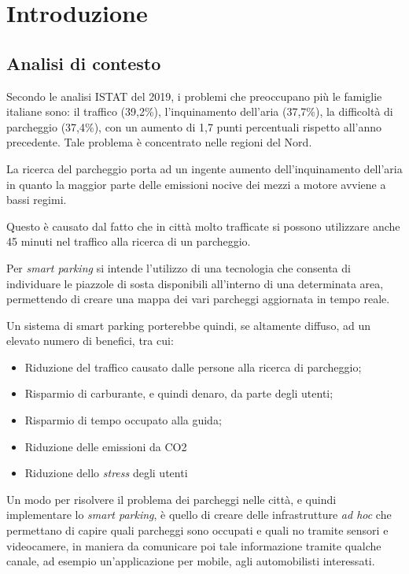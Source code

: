 \hypertarget{introduzione}{%
\chapter{Introduzione}\label{introduzione}}

\hypertarget{analisi-di-contesto}{%
\section{Analisi di contesto}\label{analisi-di-contesto}}

Secondo le analisi ISTAT del 2019, i problemi che preoccupano più le famiglie italiane sono: il traffico (39,2\%), l'inquinamento dell'aria (37,7\%), la difficoltà di parcheggio (37,4\%), con un aumento di 1,7 punti percentuali rispetto all'anno precedente. Tale problema è concentrato nelle regioni del Nord.

La ricerca del parcheggio porta ad un ingente aumento dell'inquinamento dell'aria in quanto la maggior parte delle emissioni nocive dei mezzi a motore avviene a bassi regimi.

Questo è causato dal fatto che in città molto trafficate si possono utilizzare anche 45 minuti nel traffico alla ricerca di un parcheggio. \cite{istat-mobilita}

Per \emph{smart parking} si intende l'utilizzo di una tecnologia che consenta di individuare le piazzole di sosta disponibili all'interno di una determinata area, permettendo di creare una mappa dei vari parcheggi aggiornata in tempo reale. \cite{progetto-sparta}

Un sistema di smart parking porterebbe quindi, se altamente diffuso, ad un elevato numero di benefici, tra cui:

\begin{itemize}
\item Riduzione del traffico causato dalle persone alla ricerca di parcheggio;
\item Risparmio di carburante, e quindi denaro, da parte degli utenti;
\item Risparmio di tempo occupato alla guida;
\item Riduzione delle emissioni da CO2
\item Riduzione dello \emph{stress} degli utenti
\end{itemize}

Un modo per risolvere il problema dei parcheggi nelle città, e quindi implementare lo \emph{smart parking}, è quello di creare delle infrastrutture \emph{ad hoc} che permettano di capire quali parcheggi sono occupati e quali no tramite sensori e videocamere, in maniera da comunicare poi tale informazione tramite qualche canale, ad esempio un'applicazione per mobile, agli automobilisti interessati. \cite{smart-parking}

